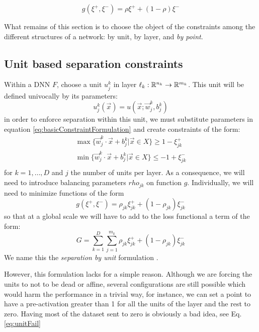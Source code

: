 \begin{equation}\label{eq:definitionOfRho}
    g(\xi^{+},\xi^{-}) = \rho\xi^{+}+(1-\rho)\xi^{-}
\end{equation}

What remains of this section is to choose the object of the constraints among the different structures of a network: by unit, by layer, and \emph{by point}.

\subsection{Unit based separation constraints \SepUnit}\label{subsec:sepUnit}
Within a \ReLU DNN $F$, choose a unit $u_j^k$ in layer $\ell_k:\mathbb{R}^{n_k}\rightarrow\mathbb{R}^{m_k}$. This unit will be defined univocally by its parameters:
\begin{equation}\label{eq:unitSepParameterWriting}
    u^k_j(\vec{x}) = u(\vec{x};\vec{w}^k_j,b^k_j)
\end{equation}
in order to enforce separation within this unit, we must substitute parameters in equation \ref{eq:basicConstraintFormulation} and create constraints of the form:
\begin{equation}
    \begin{array}{lcl}
    \max\{\vec{w}^k_j\cdot\vec{x}+b^k_j|\vec{x}\in X\}\geq 1-\xi^{+}_{jk}\\
    \min\{\vec{w}^k_j\cdot\vec{x}+b^k_j|\vec{x}\in X\}\leq -1+\xi^{-}_{jk}\\
\end{array}
\end{equation}
for $k=1,\ldots,D$ and $j$ the number of units per layer. As a consequence, we will need to introduce balancing parameters $rho_{jk}$ on function $g$. Individually, we will need to minimize functions of the form
\begin{equation}
    g(\xi^{+},\xi^{-}) = \rho_{jk}\xi^{+}_{jk}+(1-\rho_{jk})\xi^{-}_{jk}
\end{equation}
so that at a global scale we will have to add to the loss functional a term of the form:
\begin{equation}\label{eq:constraintLossForUnitSeparation}
    G = \sum_{k=1}^{D}\sum_{j=1}^{m_k}\rho_{jk}\xi^{+}_{jk}+(1-\rho_{jk})\xi^{-}_{jk}
\end{equation}
We name this the \emph{separation by unit} formulation \SepUnit.

However, this formulation lacks for a simple reason. Although we are forcing the units to not to be dead or affine, several configurations are still possible which would harm the performance in a trivial way, for instance, we can set a point to have a pre-activation greater than 1 for all the units of the layer and the rest to zero. Having most of the dataset sent to zero is obviously a bad idea, see Eq. \ref{eq:unitFail}


